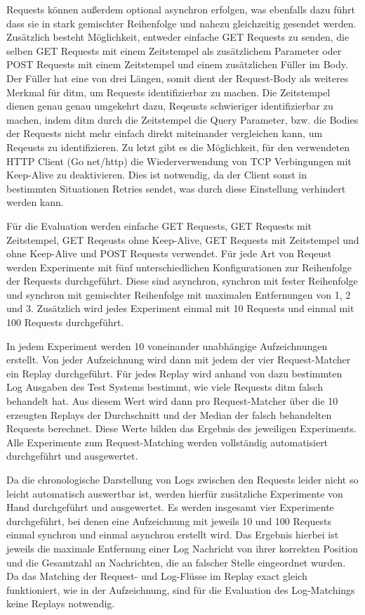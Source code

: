 \documentclass[a4paper]{report}
\begin{document}
Requests können außerdem optional asynchron erfolgen, was ebenfalls dazu führt dass sie in stark gemischter Reihenfolge und nahezu gleichzeitig
gesendet werden.
Zusätzlich besteht Möglichkeit, entweder einfache GET Requests zu senden, die selben GET Requests mit einem Zeitstempel
als zusätzlichem Parameter oder POST Requests mit einem Zeitstempel und einem zusätzlichen Füller im Body. Der Füller hat eine von
drei Längen, somit dient der Request-Body als weiteres Merkmal für ditm, um Requests identifizierbar zu machen. Die Zeitstempel dienen
genau genau umgekehrt dazu, Reqeusts schwieriger identifizierbar zu machen, indem ditm durch die Zeitstempel die Query Parameter,
bzw. die Bodies der Requests nicht mehr einfach direkt miteinander vergleichen kann, um Reqeusts zu identifizieren.
Zu letzt gibt es die Möglichkeit, für den verwendeten HTTP Client (Go net/http) die Wiederverwendung von TCP Verbingungen mit Keep-Alive
zu deaktivieren. Dies ist notwendig, da der Client sonst in bestimmten Situationen Retries sendet, was durch diese Einstellung
verhindert werden kann.

Für die Evaluation werden einfache GET Requests, GET Requests mit Zeitstempel, GET Reqeusts ohne Keep-Alive, GET Requests mit
Zeitstempel und ohne Keep-Alive und POST Requests verwendet. Für jede Art von Reqeust werden Experimente mit fünf unterschiedlichen
Konfigurationen zur Reihenfolge der Requests durchgeführt. Diese sind asynchron, synchron mit fester Reihenfolge und synchron mit gemischter
Reihenfolge mit maximalen Entfernungen von 1, 2 und 3. Zusätzlich wird jedes Experiment einmal mit 10 Requests und einmal mit 100 Requests
durchgeführt.

In jedem Experiment werden 10 voneinander unabhängige Aufzeichnungen erstellt. Von jeder Aufzeichnung wird dann mit jedem der vier
Request-Matcher ein Replay durchgeführt. Für jedes Replay wird anhand von dazu bestimmten Log Ausgaben des Test Systems bestimmt,
wie viele Requests ditm falsch behandelt hat. Aus diesem Wert wird dann pro Request-Matcher über die 10 erzeugten Replays der Durchschnitt
und der Median der falsch behandelten Requests berechnet. Diese Werte bilden das Ergebnis des jeweiligen Experiments.
Alle Experimente zum Request-Matching werden vollständig automatisiert durchgeführt und ausgewertet. %

Da die chronologische Darstellung von Logs zwischen den Requests leider nicht so leicht automatisch auswertbar ist, werden hierfür
zusätzliche Experimente von Hand durchgeführt und ausgewertet. Es werden insgesamt vier Experimente durchgeführt, bei denen eine
Aufzeichnung mit jeweils 10 und 100 Requests einmal synchron und einmal asynchron erstellt wird. Das Ergebnis hierbei ist jeweils
die maximale Entfernung einer Log Nachricht von ihrer korrekten Position und die Gesamtzahl an Nachrichten, die an falscher Stelle
eingeordnet wurden. Da das Matching der Request- und Log-Flüsse im Replay exact gleich funktioniert, wie in der Aufzeichnung, sind
für die Evaluation des Log-Matchings keine Replays notwendig.
\end{document}
